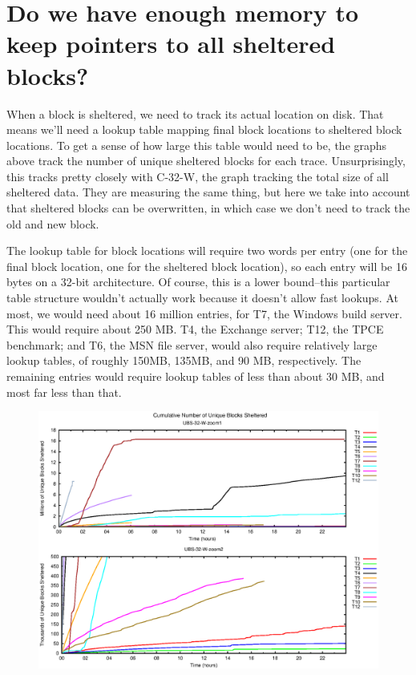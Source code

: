 \documentclass[10pt]{article}
\begin{document}
\clearpage

\section{Do we have enough memory to keep pointers to all sheltered blocks?}

When a block is sheltered, we need to track its actual location on disk.
That means we'll need a lookup table mapping final block locations to sheltered block locations.
To get a sense of how large this table would need to be, 
the graphs above track the number of unique sheltered blocks for each trace.
Unsurprisingly, this tracks pretty closely with C-32-W, the graph tracking the total size of all sheltered data.
They are measuring the same thing, but here we take into account that sheltered blocks can be overwritten,
in which case we don't need to track the old and new block.

The lookup table for block locations will require two words per entry (one for the final block location, one for the sheltered block location),
so each entry will be 16 bytes on a 32-bit architecture.
Of course, this is a lower bound--this particular table structure wouldn't actually work because it doesn't allow fast lookups.
At most, we would need about 16 million entries, for T7, the Windows build server. This would require about 250 MB.
T4, the Exchange server; T12, the TPCE benchmark; and T6, the MSN file server, would also require relatively large lookup tables,
of roughly 150MB, 135MB, and 90 MB, respectively. 
The remaining entries would require lookup tables of less than about 30 MB, and most far less than that.

\begin{figure}
\includegraphics[scale=2, width=\textwidth]{ptr_cnt.eps}
\end{figure}
\end{document}
